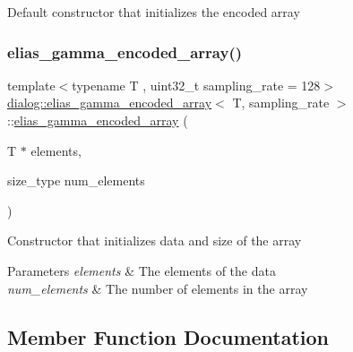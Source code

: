 Default constructor that initializes the encoded array \mbox{\label{classdialog_1_1elias__gamma__encoded__array_a65bed69251739947eabd7e0a157b8923}} 
\subsubsection{\texorpdfstring{elias\+\_\+gamma\+\_\+encoded\+\_\+array()}{elias\_gamma\_encoded\_array()}\hspace{0.1cm}{\footnotesize\ttfamily [2/2]}}
{\footnotesize\ttfamily template$<$typename T , uint32\+\_\+t sampling\+\_\+rate = 128$>$ \\
\hyperlink{classdialog_1_1elias__gamma__encoded__array}{dialog\+::elias\+\_\+gamma\+\_\+encoded\+\_\+array}$<$ T, sampling\+\_\+rate $>$\+::\hyperlink{classdialog_1_1elias__gamma__encoded__array}{elias\+\_\+gamma\+\_\+encoded\+\_\+array} (\begin{DoxyParamCaption}\item[{T $\ast$}]{elements,  }\item[{size\+\_\+type}]{num\+\_\+elements }\end{DoxyParamCaption})\hspace{0.3cm}{\ttfamily [inline]}}

Constructor that initializes data and size of the array 
\begin{DoxyParams}{Parameters}
{\em elements} & The elements of the data \\
\hline
{\em num\+\_\+elements} & The number of elements in the array \\
\hline
\end{DoxyParams}


\subsection{Member Function Documentation}
\mbox{\label{classdialog_1_1elias__gamma__encoded__array_a34a2e347fc7b8c7091590a457954522c}} 
